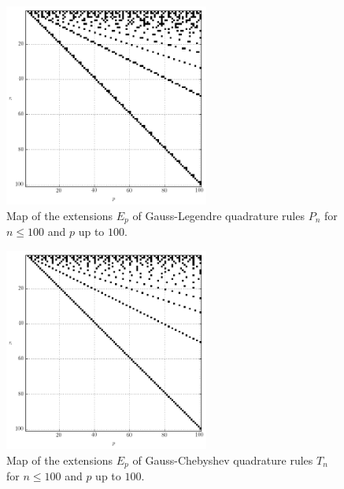 \documentclass[a4paper,10pt]{article}
\begin{document}
\begin{figure}
  \centering
  \includegraphics[width=0.6\textwidth]{./img/map_leg_100_100.png}
  \caption{Map of the extensions $E_p$ of Gauss-Legendre quadrature rules
           $P_n$ for $n \leq 100$ and $p$ up to $100$.}
  \label{fig:map_leg_100_100}
\end{figure}

\begin{figure}
  \centering
  \includegraphics[width=0.6\textwidth]{./img/map_chebt_100_100.png}
  \caption{Map of the extensions $E_p$ of Gauss-Chebyshev quadrature rules
           $T_n$ for $n \leq 100$ and $p$ up to $100$.}
  \label{fig:map_chebt_50_50}
\end{figure}
\end{document}
